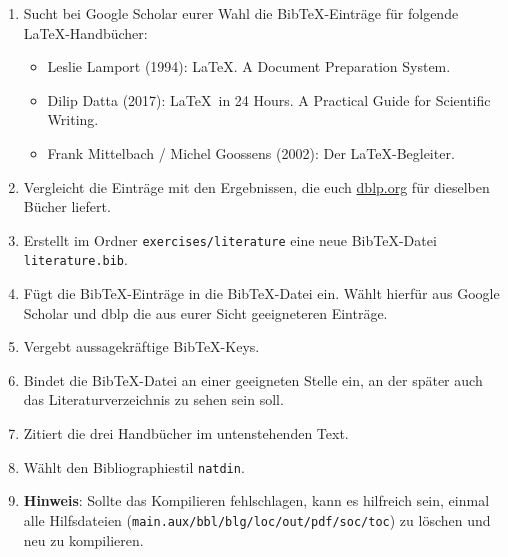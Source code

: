 \begin{enumerate}
  \item Sucht bei Google Scholar eurer Wahl die Bib\TeX-Einträge für folgende \LaTeX-Handbücher:
  \begin{itemize}
    \item Leslie Lamport (1994): \LaTeX. A Document Preparation System.
    \item Dilip Datta (2017): \LaTeX\ in 24 Hours. A Practical Guide for Scientific Writing.
    \item Frank Mittelbach / Michel Goossens (2002): Der \LaTeX-Begleiter.
  \end{itemize}
  \item Vergleicht die Einträge mit den Ergebnissen, die euch \url{dblp.org} für dieselben Bücher liefert.
  \item Erstellt im Ordner \texttt{exercises/literature} eine neue Bib\TeX-Datei \texttt{literature.bib}.
  \item Fügt die Bib\TeX-Einträge in die Bib\TeX-Datei ein. Wählt hierfür aus Google Scholar und dblp die aus eurer Sicht geeigneteren Einträge.
  \item Vergebt aussagekräftige Bib\TeX-Keys.
  \item Bindet die Bib\TeX-Datei an einer geeigneten Stelle ein, an der später auch das Literaturverzeichnis zu sehen sein soll.
  \item Zitiert die drei Handbücher im untenstehenden Text.
  \item Wählt den Bibliographiestil \texttt{natdin}.
  \item \textbf{Hinweis}: Sollte das Kompilieren fehlschlagen, kann es hilfreich sein, einmal alle Hilfsdateien (\texttt{main.aux/bbl/blg/loc/out/pdf/soc/toc}) zu löschen und neu zu kompilieren.
\end{enumerate}


